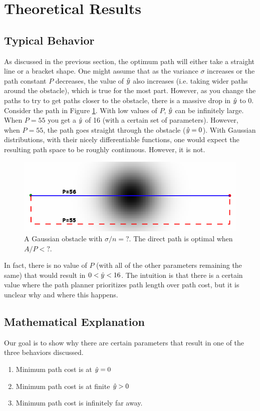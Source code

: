 \section{Theoretical Results}

\subsection{Typical Behavior}
As discussed in the previous section, the optimum path will either take a straight line or a bracket shape. One might assume that as the variance $\sigma$ increases or the path constant $P$ decreases, the value of $\hat{y}$ also increases (i.e. taking wider paths around the obstacle), which is true for the most part. However, as you change the paths to try to get paths closer to the obstacle, there is a massive drop in $\hat{y}$ to $0$. Consider the path in Figure \ref{fig:gaussian}. With low values of $P$, $\hat{y}$ can be infinitely large. When $P=55$ you get a $\hat{y}$ of 16 (with a certain set of parameters). However, when $P=55$, the path goes straight through the obstacle ($\hat{y}=0$). With Gaussian distributions, with their nicely differentiable functions, one would expect the resulting path space to be roughly continuous. However, it is not. 

\begin{figure}
\includegraphics[width=\columnwidth]{graphix/Gaussian.png}
\caption{A Gaussian obstacle with $\sigma/n=?$. The direct path is optimal when $A/P < ?$. }
\label{fig:gaussian}
\end{figure}

In fact, there is no value of $P$ (with all of the other parameters remaining the same) that would result in $0<\hat{y}<16$. The intuition is that there is a certain value where the path planner prioritizes path length over path cost, but it is unclear why and where this happens. 





\subsection{Mathematical Explanation}
Our goal is to show why there are certain parameters that result in one of the three behaviors discussed. 
\begin{enumerate}
\item Minimum path cost is at $\hat{y}=0$
\item Minimum path cost is at finite $\hat{y}>0$
\item Minimum path cost is infinitely far away. 
\end{enumerate}

